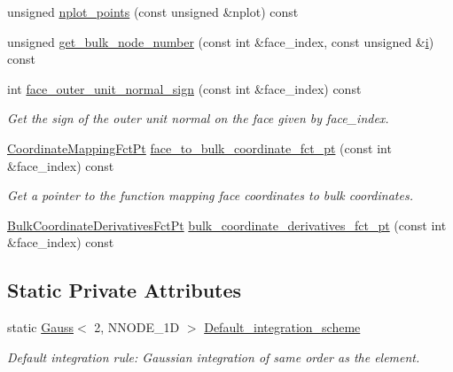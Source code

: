 \begin{DoxyCompactItemize}
unsigned \hyperlink{classoomph_1_1QElement_3_012_00_01NNODE__1D_01_4_a19edc23319f98594ea429fa9bfe859ed}{nplot\+\_\+points} (const unsigned \&nplot) const
\item 
unsigned \hyperlink{classoomph_1_1QElement_3_012_00_01NNODE__1D_01_4_aed98e224827d6dacf139587ab60c66d1}{get\+\_\+bulk\+\_\+node\+\_\+number} (const int \&face\+\_\+index, const unsigned \&\hyperlink{cfortran_8h_adb50e893b86b3e55e751a42eab3cba82}{i}) const
\item 
int \hyperlink{classoomph_1_1QElement_3_012_00_01NNODE__1D_01_4_ae1a3c4a69728998d8f4484e06ecd52a4}{face\+\_\+outer\+\_\+unit\+\_\+normal\+\_\+sign} (const int \&face\+\_\+index) const
\begin{DoxyCompactList}\small\item\em Get the sign of the outer unit normal on the face given by face\+\_\+index. \end{DoxyCompactList}\item 
\hyperlink{namespaceoomph_afa5c7a93cae1917e874b392601be0bde}{Coordinate\+Mapping\+Fct\+Pt} \hyperlink{classoomph_1_1QElement_3_012_00_01NNODE__1D_01_4_a0706636922aff0e25a26f75011ed78b3}{face\+\_\+to\+\_\+bulk\+\_\+coordinate\+\_\+fct\+\_\+pt} (const int \&face\+\_\+index) const
\begin{DoxyCompactList}\small\item\em Get a pointer to the function mapping face coordinates to bulk coordinates. \end{DoxyCompactList}\item 
\hyperlink{namespaceoomph_a0a75fbfa1139f00cf88adeee835c8fe5}{Bulk\+Coordinate\+Derivatives\+Fct\+Pt} \hyperlink{classoomph_1_1QElement_3_012_00_01NNODE__1D_01_4_a705bcbb69709909c93299e1f7a7c39e8}{bulk\+\_\+coordinate\+\_\+derivatives\+\_\+fct\+\_\+pt} (const int \&face\+\_\+index) const
\end{DoxyCompactItemize}
\subsection*{Static Private Attributes}
\begin{DoxyCompactItemize}
\item 
static \hyperlink{classoomph_1_1Gauss}{Gauss}$<$ 2, N\+N\+O\+D\+E\+\_\+1D $>$ \hyperlink{classoomph_1_1QElement_3_012_00_01NNODE__1D_01_4_a99c4d04afa691068fcdf8f3a735aaf0a}{Default\+\_\+integration\+\_\+scheme}
\begin{DoxyCompactList}\small\item\em Default integration rule\+: Gaussian integration of same \textquotesingle{}order\textquotesingle{} as the element. \end{DoxyCompactList}\end{DoxyCompactItemize}

